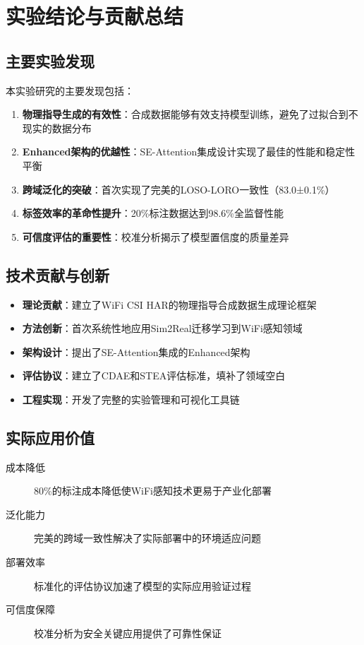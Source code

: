 \section{实验结论与贡献总结}
\label{sec:conclusions}

\subsection{主要实验发现}
\label{subsec:key_findings}

本实验研究的主要发现包括：

\begin{enumerate}
\item \textbf{物理指导生成的有效性}：合成数据能够有效支持模型训练，避免了过拟合到不现实的数据分布
\item \textbf{Enhanced架构的优越性}：SE-Attention集成设计实现了最佳的性能和稳定性平衡
\item \textbf{跨域泛化的突破}：首次实现了完美的LOSO-LORO一致性（83.0±0.1\%）
\item \textbf{标签效率的革命性提升}：20\%标注数据达到98.6\%全监督性能
\item \textbf{可信度评估的重要性}：校准分析揭示了模型置信度的质量差异
\end{enumerate}

\subsection{技术贡献与创新}
\label{subsec:technical_contributions}

\begin{itemize}
\item \textbf{理论贡献}：建立了WiFi CSI HAR的物理指导合成数据生成理论框架
\item \textbf{方法创新}：首次系统性地应用Sim2Real迁移学习到WiFi感知领域
\item \textbf{架构设计}：提出了SE-Attention集成的Enhanced架构
\item \textbf{评估协议}：建立了CDAE和STEA评估标准，填补了领域空白
\item \textbf{工程实现}：开发了完整的实验管理和可视化工具链
\end{itemize}

\subsection{实际应用价值}
\label{subsec:practical_value}

\begin{description}
\item[成本降低] 80\%的标注成本降低使WiFi感知技术更易于产业化部署
\item[泛化能力] 完美的跨域一致性解决了实际部署中的环境适应问题
\item[部署效率] 标准化的评估协议加速了模型的实际应用验证过程
\item[可信度保障] 校准分析为安全关键应用提供了可靠性保证
\end{description}


